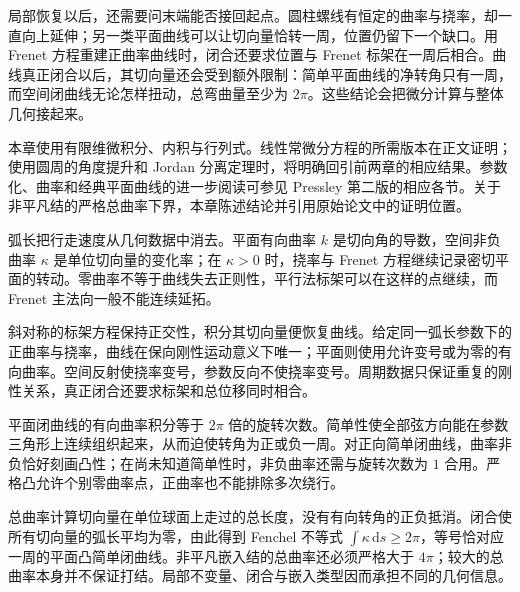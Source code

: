 \ProseParagraphBreak

局部恢复以后，还需要问末端能否接回起点。圆柱螺线有恒定的曲率与挠率，却一直向上延伸；另一类平面曲线可以让切向量恰转一周，位置仍留下一个缺口。用 Frenet 方程重建正曲率曲线时，闭合还要求位置与 Frenet 标架在一周后相合。曲线真正闭合以后，其切向量还会受到额外限制：简单平面曲线的净转角只有一周，而空间闭曲线无论怎样扭动，总弯曲量至少为 \(2\pi\)。这些结论会把微分计算与整体几何接起来。

\ProseParagraphBreak

本章使用有限维微积分、内积与行列式。线性常微分方程的所需版本在正文证明；使用圆周的角度提升和 Jordan 分离定理时，将明确回引前两章的相应结果。参数化、曲率和经典平面曲线的进一步阅读可参见 Pressley 第二版的相应各节\cite[第1.1--1.4, 2.1--2.3, 3.1节]{Pressley2010}。关于非平凡结的严格总曲率下界，本章陈述结论并引用原始论文中的证明位置。






\begin{chaptersummary}
	弧长把行走速度从几何数据中消去。平面有向曲率 \(k\) 是切向角的导数，空间非负曲率 \(\kappa\) 是单位切向量的变化率；在 \(\kappa>0\) 时，挠率与 Frenet 方程继续记录密切平面的转动。零曲率不等于曲线失去正则性，平行法标架可以在这样的点继续，而 Frenet 主法向一般不能连续延拓。

	\ProseParagraphBreak

	斜对称的标架方程保持正交性，积分其切向量便恢复曲线。给定同一弧长参数下的正曲率与挠率，曲线在保向刚性运动意义下唯一；平面则使用允许变号或为零的有向曲率。空间反射使挠率变号，参数反向不使挠率变号。周期数据只保证重复的刚性关系，真正闭合还要求标架和总位移同时相合。

	\ProseParagraphBreak

	平面闭曲线的有向曲率积分等于 \(2\pi\) 倍的旋转次数。简单性使全部弦方向能在参数三角形上连续组织起来，从而迫使转角为正或负一周。对正向简单闭曲线，曲率非负恰好刻画凸性；在尚未知道简单性时，非负曲率还需与旋转次数为 \(1\) 合用。严格凸允许个别零曲率点，正曲率也不能排除多次绕行。

	\ProseParagraphBreak

	总曲率计算切向量在单位球面上走过的总长度，没有有向转角的正负抵消。闭合使所有切向量的弧长平均为零，由此得到 Fenchel 不等式 \(\int\kappa\,\mathrm ds\ge2\pi\)，等号恰对应一周的平面凸简单闭曲线。非平凡嵌入结的总曲率还必须严格大于 \(4\pi\)；较大的总曲率本身并不保证打结。局部不变量、闭合与嵌入类型因而承担不同的几何信息。
\end{chaptersummary}

